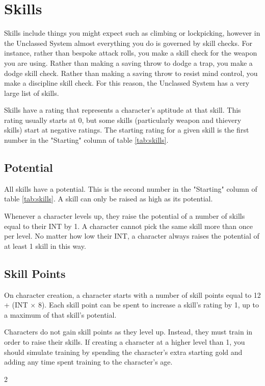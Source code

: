 \chapter{Skills}\label{skills}





\begin{multicols}{2}
    Skills include things you might expect such as climbing or lockpicking,
    however in the Unclassed System almost everything you do is governed by
    skill checks. For instance, rather than bespoke attack rolls, you make
    a skill check for the weapon you are using. Rather than making a saving
    throw to dodge a trap, you make a dodge skill check. Rather than making
    a saving throw to resist mind control, you make a discipline skill check.
    For this reason, the Unclassed System has a very large list of skills.

    Skills have a rating that represents a character's aptitude at that skill.
    This rating usually starts at 0, but some skills (particularly weapon
    and thievery skills) start at negative ratings. The starting rating for
    a given skill is the first number in the "Starting" column of table
    \ref{tab:skills}.

    \section{Potential}
    All skills have a potential. This is the second number in the "Starting"
    column of table \ref{tab:skills}. A skill can only be raised as high as
    its potential.

    Whenever a character levels up, they raise the potential of a number of
    skills equal to their INT by 1. A character cannot pick the same skill more
    than once per level. No matter how low their INT, a character always raises
    the potential of at least 1 skill in this way.

    \section{Skill Points}
    On character creation, a character starts with a number of skill points
    equal to 12 + (INT $\times$ 8). Each skill point can be spent to increase
    a skill's rating by 1, up to a maximum of that skill's potential.

    Characters do not gain skill points as they level up. Instead, they must
    train in order to raise their skills. If creating a character at a higher
    level than 1, you should simulate training by spending the character's
    extra starting gold and adding any time spent training to the character's
    age.
\end{multicols}{2}

